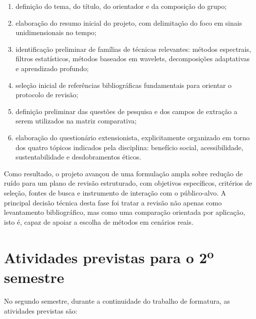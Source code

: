 \begin{enumerate}[label=\alph*)]
    \item definição do tema, do título, do orientador e da composição do grupo;
    \item elaboração do resumo inicial do projeto, com delimitação do foco em sinais unidimensionais no tempo;
    \item identificação preliminar de famílias de técnicas relevantes: métodos espectrais, filtros estatísticos, métodos baseados em wavelets, decomposições adaptativas e aprendizado profundo;
    \item seleção inicial de referências bibliográficas fundamentais para orientar o protocolo de revisão;
    \item definição preliminar das questões de pesquisa e dos campos de extração a serem utilizados na matriz comparativa;
    \item elaboração do questionário extensionista, explicitamente organizado em torno dos quatro tópicos indicados pela disciplina: benefício social, acessibilidade, sustentabilidade e desdobramentos éticos.
\end{enumerate}

Como resultado, o projeto avançou de uma formulação ampla sobre redução de ruído para um plano de revisão estruturado, com objetivos específicos, critérios de seleção, fontes de busca e instrumento de interação com o público-alvo. A principal decisão técnica desta fase foi tratar a revisão não apenas como levantamento bibliográfico, mas como uma comparação orientada por aplicação, isto é, capaz de apoiar a escolha de métodos em cenários reais.

\newpage

\section{Atividades previstas para o \texorpdfstring{2\textsuperscript{o}}{2o} semestre}

No segundo semestre, durante a continuidade do trabalho de formatura, as atividades previstas são:

